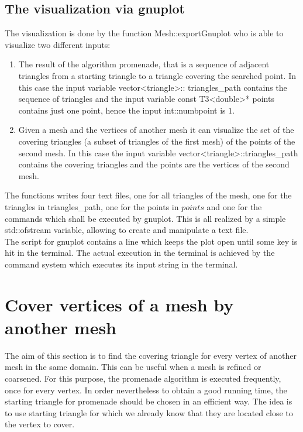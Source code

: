 \documentclass[10pt]{article}
\begin{document}
\subsection{The visualization via gnuplot}
	The visualization is done by the function {\ttfamily Mesh::exportGnuplot} who is able to visualize two different inputs: 
	\begin{enumerate}
		\item 
		The result of the algorithm promenade, that is a sequence of adjacent triangles from a starting triangle to a triangle covering the searched point. 
		In this case the input variable {\ttfamily vector<triangle>:: triangles\_path} contains the sequence of triangles and the input variable {\ttfamily const T3<double>* points} contains just one point, hence the input {\ttfamily int::numbpoint } is $ 1 $. 
		\item 
		Given a mesh and the vertices of another mesh it can visualize the set of the covering triangles (a subset of triangles of the first mesh) of the points of the second mesh. 
		In this case the input variable {\ttfamily vector<triangle>::triangles\_path} contains the covering triangles and the {\ttfamily points} are the vertices of the second mesh. 
	\end{enumerate}
The functions writes four text files, one for all triangles of the mesh, one for the triangles in {\ttfamily triangles\_path}, one for the points in $ points $ and one for the commands which shall be executed by gnuplot. This is all realized by a simple {\ttfamily std::ofstream} variable, allowing to create and manipulate a text file. \\
The script for gnuplot contains a line which keeps the plot open until some key is hit in the terminal. 
The actual execution in the terminal is achieved by the command {\ttfamily system} which executes its input string in the terminal. 

\section{Cover vertices of a mesh by another mesh}

The aim of this section is to find the covering triangle for every vertex of another mesh in the same domain. This can be useful when a mesh is refined or coarsened. For this purpose, the promenade algorithm is executed frequently, once for every vertex. In order nevertheless to obtain a good running time, the starting triangle for {\ttfamily promenade} should be chosen in an efficient way. The idea is to use starting triangle for which we already know that they are located close to the vertex to cover.
\end{document}
